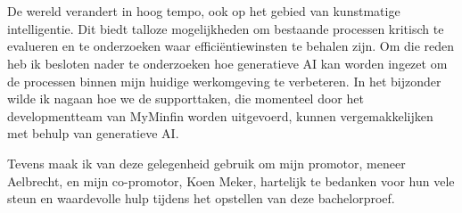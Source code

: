 
\chapter*{}%
\label{ch:voorwoord}


De wereld verandert in hoog tempo, ook op het gebied van kunstmatige intelligentie. Dit biedt talloze mogelijkheden om bestaande processen kritisch te evalueren en te onderzoeken waar efficiëntiewinsten te behalen zijn. Om die reden heb ik besloten nader te onderzoeken hoe generatieve AI kan worden ingezet om de processen binnen mijn huidige werkomgeving te verbeteren. In het bijzonder wilde ik nagaan hoe we de supporttaken, die momenteel door het developmentteam van MyMinfin worden uitgevoerd, kunnen vergemakkelijken met behulp van generatieve AI.

Tevens maak ik van deze gelegenheid gebruik om mijn promotor, meneer Aelbrecht, en mijn co-promotor, Koen Meker, hartelijk te bedanken voor hun vele steun en waardevolle hulp tijdens het opstellen van deze bachelorproef.
